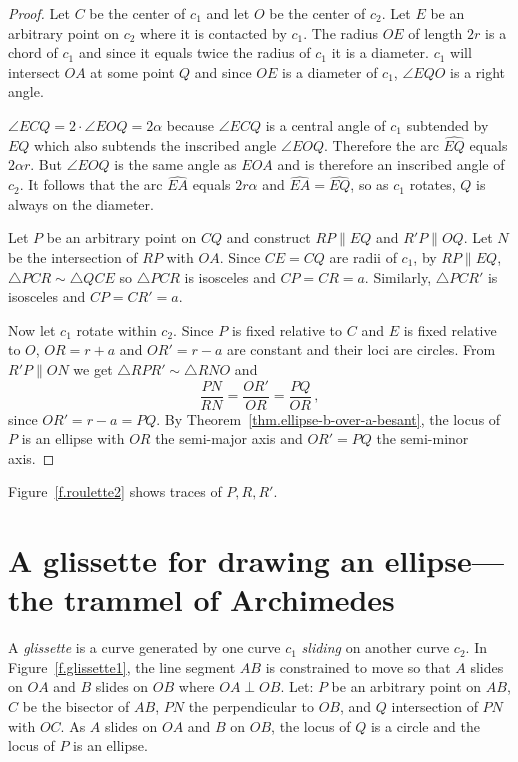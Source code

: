 \begin{proof}
Let $C$ be the center of $c_1$ and let $O$ be the center of $c_2$. Let $E$ be an arbitrary point on $c_2$ where it is contacted by $c_1$. The radius $OE$ of length $2r$ is a chord of $c_1$ and since it equals twice the radius of $c_1$ it is a diameter. $c_1$ will intersect $OA$ at some point $Q$ and since $OE$ is a diameter of $c_1$, $\angle EQO$ is a right angle.

$\angle ECQ=2\cdot\angle EOQ=2\alpha$ because $\angle ECQ$ is a central angle of $c_1$ subtended by $EQ$ which also subtends the inscribed angle $\angle EOQ$. Therefore the arc $\widehat{EQ}$ equals $2\alpha r$. But $\angle EOQ$ is the same angle as $EOA$ and is therefore an inscribed angle of $c_2$. It follows that the arc $\widehat{EA}$ equals $2r\alpha$ and $\widehat{EA} =\widehat{EQ}$, so as $c_1$ rotates, $Q$ is always on the diameter.

Let $P$ be an arbitrary point on $CQ$ and construct $RP\parallel EQ$ and $R'P\parallel OQ$. Let $N$ be the intersection of $RP$ with $OA$. Since $CE=CQ$ are radii of $c_1$, by $RP\parallel EQ$, $\triangle PCR\sim \triangle QCE$ so $\triangle PCR$ is isosceles and $CP=CR=a$. Similarly, $\triangle PCR'$ is isosceles and $CP=CR'=a$.

Now let $c_1$ rotate within $c_2$. Since $P$ is fixed relative to $C$ and $E$ is fixed relative to $O$, $OR=r+a$ and $OR'=r-a$ are constant and their loci are circles. From $R'P\parallel ON$ we get $\triangle RPR'\sim \triangle RNO$ and
\[
\frac{PN}{RN} = \frac{OR'}{OR}=\frac{PQ}{OR}\,,
\]
since $OR'=r-a=PQ$. By Theorem~\ref{thm.ellipse-b-over-a-besant}, the locus of $P$ is an ellipse with $OR$ the semi-major axis and $OR'=PQ$ the semi-minor axis.\hqed
\end{proof}

Figure~\ref{f.roulette2} shows traces of $P,R,R'$.


\section{A glissette for drawing an ellipse---the trammel of Archimedes}\label{s.glissette}

 A \emph{glissette} is a curve generated by one curve $c_1$ \emph{sliding} on another curve $c_2$. In Figure~\ref{f.glissette1}, the line segment $AB$ is constrained to move so that $A$ slides on $OA$ and $B$ slides on $OB$ where $OA\perp OB$. Let: $P$ be an arbitrary point on $AB$, $C$ be the bisector of $AB$, $PN$ the perpendicular to $OB$, and $Q$ intersection of $PN$ with $OC$. As $A$ slides on $OA$ and $B$ on $OB$, the locus of $Q$ is a circle and the locus of $P$ is an ellipse.

